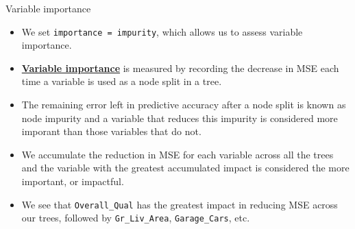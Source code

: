 \documentclass[
  10pt,
  ignorenonframetext,
]{beamer}
\providecommand{\tightlist}{%
  \setlength{\itemsep}{0pt}\setlength{\parskip}{0pt}}
\begin{document}
\begin{frame}[fragile]{Variable importance}
\protect\hypertarget{variable-importance}{}

\begin{itemize}
\tightlist
\item
  We set
  \texttt{importance\ =\ \textquotesingle{}impurity\textquotesingle{}},
  which allows us to assess variable importance.
\item
  \href{https://topepo.github.io/caret/variable-importance.html}{\textbf{Variable
  importance}} is measured by recording the decrease in MSE each time a
  variable is used as a node split in a tree.
\item
  The remaining error left in predictive accuracy after a node split is
  known as node impurity and a variable that reduces this impurity is
  considered more imporant than those variables that do not.
\item
  We accumulate the reduction in MSE for each variable across all the
  trees and the variable with the greatest accumulated impact is
  considered the more important, or impactful.
\item
  We see that \texttt{Overall\_Qual} has the greatest impact in reducing
  MSE across our trees, followed by \texttt{Gr\_Liv\_Area},
  \texttt{Garage\_Cars}, etc.
\end{itemize}

\end{frame}
\end{document}

